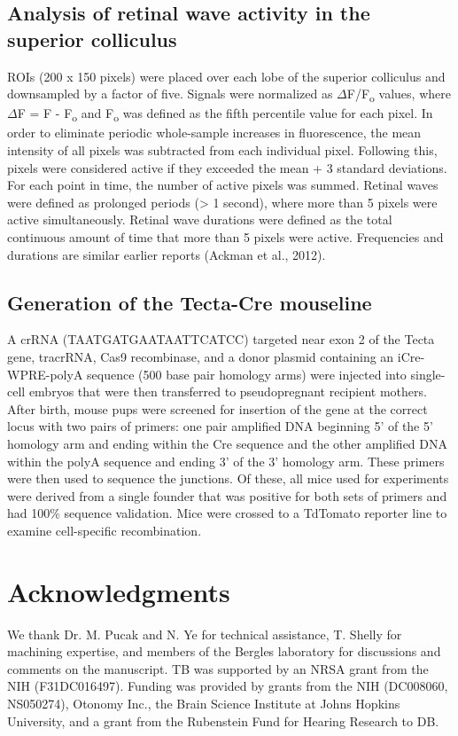 \documentclass[9pt,lineno]{elife}
\begin{document}
\subsection{Analysis of retinal wave activity in the superior colliculus}
ROIs (200 x 150 pixels) were placed over each lobe of the superior colliculus and downsampled by a factor of five. Signals were normalized as $ \Delta $F/F\textsubscript{o} values, where $ \Delta $F = F - F\textsubscript{o} and F\textsubscript{o} was defined as the fifth percentile value for each pixel. In order to eliminate periodic whole-sample increases in fluorescence, the mean intensity of all pixels was subtracted from each individual pixel. Following this, pixels were considered active if they exceeded the mean + 3 standard deviations. For each point in time, the number of active pixels was summed. Retinal waves were defined as prolonged periods (> 1 second), where more than 5 pixels were active simultaneously. Retinal wave durations were defined as the total continuous amount of time that more than 5 pixels were active. Frequencies and durations are similar earlier reports (Ackman et al., 2012).

\subsection{Generation of the Tecta-Cre mouseline}
A crRNA (TAATGATGAATAATTCATCC) targeted near exon 2 of the Tecta gene, tracrRNA, Cas9 recombinase, and a donor plasmid containing an iCre-WPRE-polyA sequence (500 base pair homology arms) were injected into single-cell embryos that were then transferred to pseudopregnant recipient mothers. After birth, mouse pups were screened for insertion of the gene at the correct locus with two pairs of primers: one pair amplified DNA beginning 5’ of the 5’ homology arm and ending within the Cre sequence and the other amplified DNA within the polyA sequence and ending 3’ of the 3’ homology arm. These primers were then used to sequence the junctions. Of these, all mice used for experiments were derived from a single founder that was positive for both sets of primers and had 100\% sequence validation. Mice were crossed to a TdTomato reporter line to examine cell-specific recombination.

\section{Acknowledgments}

We thank Dr. M. Pucak and N. Ye for technical assistance, T. Shelly for machining expertise, and members of the Bergles laboratory for discussions and comments on the manuscript. TB was supported by an NRSA grant from the NIH (F31DC016497). Funding was provided by grants from the NIH (DC008060, NS050274), Otonomy Inc., the Brain Science Institute at Johns Hopkins University, and a grant from the Rubenstein Fund for Hearing Research to DB. 
\end{document}
